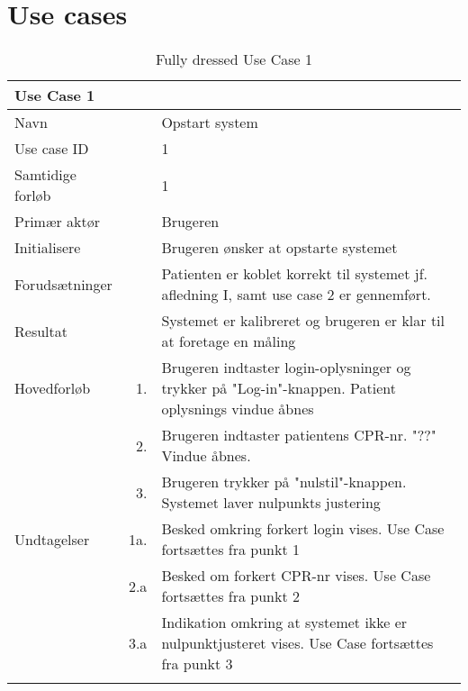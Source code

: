 \section{Use cases}

\begin{longtabu} to  %
    {\large \textbf{Use Case 1}} && \\
    \toprule
    Navn &&    Opstart system\\
    Use case ID &&    1\\
    Samtidige forløb &&    1\\
    Primær aktør &&    Brugeren\\
    Initialisere &&    Brugeren ønsker at opstarte systemet\\
    Forudsætninger &&  Patienten er koblet korrekt til systemet jf. afledning I, samt use case 2 er gennemført.\\
    Resultat &&    Systemet er kalibreret og brugeren er klar til at foretage en måling\\
    \midrule
    Hovedforløb &    1. &    Brugeren indtaster login-oplysninger og trykker på "Log-in"\--knappen. Patient oplysnings vindue åbnes \\
    	&			2. & Brugeren indtaster patientens CPR-nr. "??" Vindue åbnes.  \\	
    	&			3. & Brugeren trykker på "nulstil"\--knappen. Systemet laver nulpunkts justering  \\ \midrule
    Undtagelser &    1a. & Besked omkring forkert login vises. Use Case fortsættes fra punkt 1     \\ 
    	&			2.a & Besked om forkert CPR-nr vises. Use Case fortsættes fra punkt 2 \\ 
    	&			3.a & Indikation omkring at systemet ikke er nulpunktjusteret vises. Use Case fortsættes fra punkt 3 \\ \bottomrule    
\caption{Fully dressed Use Case 1}
\label{UC1}
\end{longtabu}

